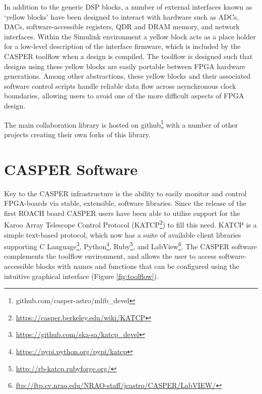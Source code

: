 \documentclass{ws-jai}
\begin{document}
In addition to the generic DSP blocks, a number of external interfaces known as
`yellow blocks' have been designed to interact with hardware such as
ADCs, DACs, software-accessible registers, QDR and DRAM memory, and network
interfaces. 
Within the Simulink environment a yellow block acts as a place holder for a low-level description of the interface firmware, which is included by the CASPER toolflow when a design is compiled. The toolflow is designed such that designs using these yellow blocks are easily portable between FPGA hardware generations.
Among other abstractions, these yellow blocks and their associated software control scripts handle reliable data flow across asynchronous clock boundaries, allowing users to avoid one of the more difficult aspects of FPGA design.

The main collaboration library is hosted on
github\footnote{github.com/casper-astro/mlib\_devel} with a number of
other projects creating their own forks of this library.

\section{CASPER Software} \label{sec:Software}
Key to the CASPER infrastructure is the ability to easily monitor and control
FPGA-boards via stable, extensible, software libraries. Since the release of the
first ROACH board CASPER users have been able to utilise support for the Karoo
Array Telescope Control Protocol
(KATCP\footnote{\url{https://casper.berkeley.edu/wiki/KATCP}}) to fill this
need. KATCP is a simple text-based protocol, which now has a suite of available
client libraries supporting C Language\footnote{\url{https://github.com/ska-sa/katcp_devel}}, Python\footnote{\url{https://pypi.python.org/pypi/katcp}}, Ruby\footnote{\url{http://rb-katcp.rubyforge.org/}}, and LabView\footnote{\url{ftp://ftp.cv.nrao.edu/NRAO-staff/jcastro/CASPER/LabVIEW/}}.
The CASPER software complements the toolflow environment, and allows the user to access software-accessible blocks with names and functions that can be configured using the intuitive graphical interface (Figure \ref{fig:toolflow}). 
\end{document}
